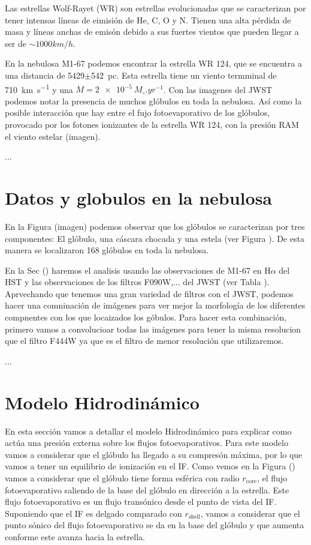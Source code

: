 \documentclass[twocolumn, times]{aastex631}
\begin{document}
Las estrellas Wolf-Rayet (WR) son estrellas evolucionadas que se caracterizan por tener intensas líneas de eimisión de  He, C, O y N. Tienen una alta pérdida de masa y líneas anchas de emisón debido a sus fuertes vientos que pueden llegar a ser de $\sim 1000 km/h$.

En la nebulosa M1-67 podemos encontrar la estrella WR 124, que se encuentra a una distancia de 5429$\pm$\SI{542}{pc}. Esta estrella tiene un viento termminal de \SI{710}{km.s^{-1}} y una $\dot{M}=\SI{2e-5}{M_\circ.yr^{-1}}$. Con las imagenes del JWST podemos notar la presencia de muchos glóbulos en toda la nebulosa. Así como la posible interacción que hay entre el fujo fotoevaporativo de los glóbulos, provocado por los fotones ionizantes de la estrella WR 124, con la presión RAM el viento estelar (imagen). 

...

\section{Datos y globulos en la nebulosa}
\label{sec:globulos en la nebulosa}

En la Figura (imagen) podemos observar que los glóbulos se caracterizan por tres componentes: El glóbulo, una cáscara chocada y una estela (ver Figura ). De esta manera se localizaron 168 glóbulos en toda la nebulosa.

En la Sec () haremos el analisis usando las observaciones de M1-67 en H$\alpha$ del HST y las observaciones de los filtros F090W,... del JWST (ver Tabla ). Aprvechando que tenemos una gran variedad de filtros con el JWST, podemos hacer una comninación de imágenes para ver mejor la morfología de los diferentes compnentes con los que locaizados los góbulos. Para hacer esta combinación, primero vamos a convolucioar todas las imágenes para tener la misma resolucion que el filtro F444W ya que es el filtro de menor resolución que utilizaremos.

...

\section{Modelo Hidrodinámico}
\label{Sec:Modelo}

En esta sección vamos a detallar el modelo Hidrodinámico para explicar como actúa una presión externa sobre los flujos fotoevaporativos.
Para este modelo vamos a considerar que el glóbulo ha llegado a su compresón máxima, por lo que vamos a tener un equilibrio de ionización en el IF. Como vemos en la Figura () vamos a considerar que el glóbulo tiene forma esférica con radio $r_\mathrm{core}$, el flujo fotoevaporativo saliendo de la base del glóbulo en dirección a la estrella. Este flujo fotoevaporativo es un flujo transónico desde el punto de vista del IF. Suponiendo que el IF es delgado comparado con $r_\mathrm{shell}$, vamos a considerar que el punto sónico del flujo fotoevaporativo se da en la base del glóbulo y que aumenta conforme este avanza hacia la estrella.
\end{document}
